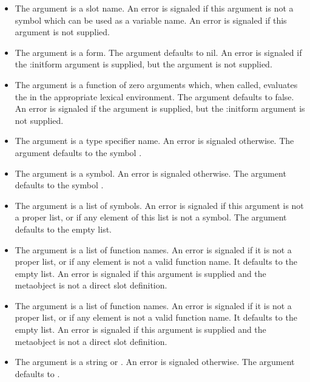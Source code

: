 \begin{itemize}
\item The  argument is a slot name. An error is signaled if this
  argument is not a symbol which can be used as a variable name. An error is
  signaled if this argument is not supplied.

\item The  argument is a form. The  argument
  defaults to nil. An error is signaled if the :initform argument is supplied,
  but the  argument is not supplied.

\item The  argument is a function of zero arguments which,
  when called, evaluates the  in the appropriate lexical
  environment. The  argument defaults to false. An error is
  signaled if the  argument is supplied, but the :initform
  argument is not supplied.

\item The  argument is a type specifier name. An error is signaled
  otherwise. The  argument defaults to the symbol .

\item The  argument is a symbol. An error is signaled
  otherwise. The  argument defaults to the symbol
  .

\item The  argument is a list of symbols. An error is signaled if
  this argument is not a proper list, or if any element of this list is not a
  symbol. The  argument defaults to the empty list.

\item The  argument is a list of function names. An error is signaled if
  it is not a proper list, or if any element is not a valid function name. It
  defaults to the empty list. An error is signaled if this argument is supplied
  and the metaobject is not a direct slot definition.

\item The  argument is a list of function names. An error is signaled if
  it is not a proper list, or if any element is not a valid function name. It
  defaults to the empty list. An error is signaled if this argument is supplied
  and the metaobject is not a direct slot definition.

\item The  argument is a string or . An error is
  signaled otherwise. The  argument defaults to .
\end{itemize}

